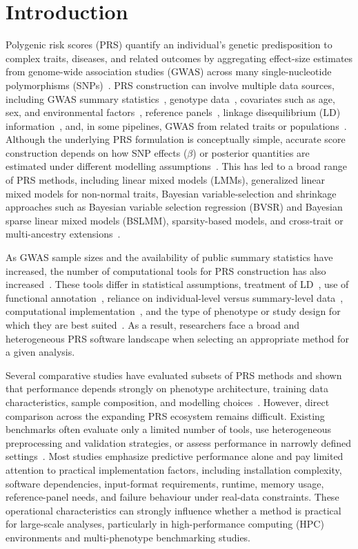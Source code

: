 \documentclass[pdflatex,sn-basic]{sn-jnl}
\begin{document}
 
\newpage
\section*{Introduction}
Polygenic risk scores (PRS) quantify an individual’s genetic predisposition to complex traits, diseases, and related outcomes by aggregating effect-size estimates from genome-wide association studies (GWAS) across many single-nucleotide polymorphisms (SNPs)~\cite{Choi2020,Lewis2020,RN8133,Nakase2024}. PRS construction can involve multiple data sources, including GWAS summary statistics~\cite{Nakase2024}, genotype data~\cite{Hui2023}, covariates such as age, sex, and environmental factors~\cite{Hui2023}, reference panels~\cite{Loh2023}, linkage disequilibrium (LD) information~\cite{Vilhjalmsson2015}, and, in some pipelines, GWAS from related traits or populations~\cite{Zhuang2024}. Although the underlying PRS formulation is conceptually simple, accurate score construction depends on how SNP effects ($\beta$) or posterior quantities are estimated under different modelling assumptions~\cite{ZHU20201557,Barry2022}. This has led to a broad range of PRS methods, including linear mixed models (LMMs), generalized linear mixed models for non-normal traits, Bayesian variable-selection and shrinkage approaches such as Bayesian variable selection regression (BVSR) and Bayesian sparse linear mixed models (BSLMM), sparsity-based models, and cross-trait or multi-ancestry extensions~\cite{Loh2023,ZHU20201557,Barry2022}.

As GWAS sample sizes and the availability of public summary statistics have increased, the number of computational tools for PRS construction has also increased~\cite{Choi2020,Lewis2020}. These tools differ in statistical assumptions, treatment of LD~\cite{Vilhjalmsson2015}, use of functional annotation~\cite{Zhuang2024}, reliance on individual-level versus summary-level data~\cite{Hui2023}, computational implementation~\cite{ZHU20201557,Barry2022}, and the type of phenotype or study design for which they are best suited~\cite{Ma2021,Zhang2021}. As a result, researchers face a broad and heterogeneous PRS software landscape when selecting an appropriate method for a given analysis.

Several comparative studies have evaluated subsets of PRS methods and shown that performance depends strongly on phenotype architecture, training data characteristics, sample composition, and modelling choices~\cite{Ma2021,Zhang2021}. However, direct comparison across the expanding PRS ecosystem remains difficult. Existing benchmarks often evaluate only a limited number of tools, use heterogeneous preprocessing and validation strategies, or assess performance in narrowly defined settings~\cite{Ma2021,Zhang2021}. Most studies emphasize predictive performance alone and pay limited attention to practical implementation factors, including installation complexity, software dependencies, input-format requirements, runtime, memory usage, reference-panel needs, and failure behaviour under real-data constraints. These operational characteristics can strongly influence whether a method is practical for large-scale analyses, particularly in high-performance computing (HPC) environments and multi-phenotype benchmarking studies.
\end{document}
